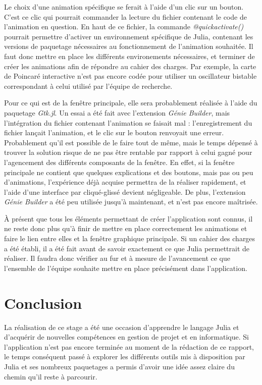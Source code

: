 \documentclass[a4paper, french, 12pt, titlepage]{article}
\begin{document}
Le choix d'une animation spécifique se ferait à l'aide d'un clic sur un bouton.
C'est ce clic qui pourrait commander la lecture du fichier contenant le code de l'animation en question.
En haut de ce fichier, la commande \emph{@quickactivate()} pourrait permettre d'activer un environnement spécifique de Julia, contenant les versions de paquetage nécessaires au fonctionnement de l'animation souhaitée.
Il faut donc mettre en place les différents environements nécessaires, et terminer de créer les animations afin de répondre au cahier des charges.
Par exemple, la carte de Poincaré interactive n'est pas encore codée pour utiliser un oscillateur bistable correspondant à celui utilisé par l'équipe de recherche. 

Pour ce qui est de la fenêtre principale, elle sera probablement réalisée à l'aide du paquetage \emph{Gtk.jl}.
Un essai a été fait avec l'extension \emph{Génie Builder}, mais l'intégration du fichier contenant l'animation se faisait mal : l'enregistrement du fichier lançait l'animation, et le clic sur le bouton renvoyait une erreur.
Probablement qu'il est possible de le faire tout de même, mais le temps dépensé à trouver la solution risque de ne pas être rentable par rapport à celui gagné pour l'agencement des différents composants de la fenêtre.
En effet, si la fenêtre principale ne contient que quelques explications et des boutons, mais pas ou peu d'animations, l'expérience déjà acquise permettra de la réaliser rapidement, et l'aide d'une interface par cliqué-glissé devient négligeable.
De plus, l'extension \emph{Génie Builder} a été peu utilisée jusqu'à maintenant, et n'est pas encore maîtrisée. 

À présent que tous les éléments permettant de créer l'application sont connus, il ne reste donc plus qu'à finir de mettre en place correctement les animations et faire le lien entre elles et la fenêtre graphique principale.
Si un cahier des charges a été établi, il a été fait avant de savoir exactement ce que Julia permettrait de réaliser.
Il faudra donc vérifier au fur et à mesure de l'avancement ce que l'ensemble de l'équipe souhaite mettre en place précisément dans l'application.

\newpage

\section{Conclusion}

La réalisation de ce stage a été une occasion d'apprendre le langage Julia et d'acquérir de nouvelles compétences en gestion de projet et en informatique.
Si l'application n'est pas encore terminée au moment de la rédaction de ce rapport, le temps conséquent passé à explorer les différents outils mis à disposition par Julia et ses nombreux paquetages a permis d'avoir une idée assez claire du chemin qu'il reste à parcourir. 
\end{document}
